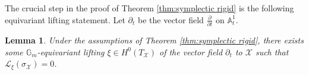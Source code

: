 \documentclass[12pt]{amsart}
\newtheorem{lem}[prop]{Lemma}
\theoremstyle{definition}
\newcommand{\bA}{\mathbb{A}}
\newcommand{\bG}{\mathbb{G}}
\newcommand{\cL}{\mathcal{L}}
\newcommand{\scX}{\mathscr{X}}
\numberwithin{equation}{section}
\begin{document}

The crucial step in the proof of Theorem \ref{thm:symplectic rigid} is the following equivariant lifting statement. Let $\partial_t$ be the vector field $\frac{\partial}{\partial t}$ on $\bA^1_t$.

\begin{lem} \label{lem:lift vector field}
Under the assumptions of Theorem \ref{thm:symplectic rigid}, there exists some $\bG_m$-equivariant lifting $\xi\in H^0(T_{\scX})$ of the vector field $\partial_t$ to $\scX$ such that $\cL_\xi (\sigma_{\scX})=0$.
\end{lem}

\end{document}
